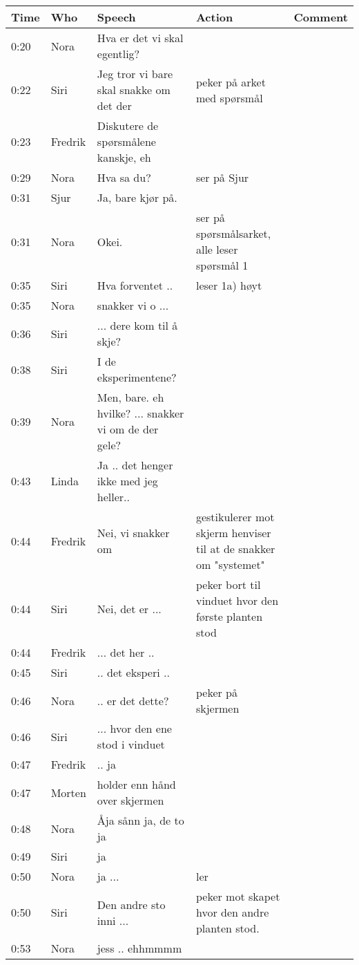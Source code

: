 
\def\arraystretch{1.8}
\begin{longtable}{@{}l l p{100pt} p{80pt} p{80pt}@{}}\toprule
    
    Time            & Who & Speech & Action & Comment \\ \midrule        

    0:20 &	Nora	& Hva er det vi skal egentlig?		\\
0:22	&	Siri	& Jeg tror vi bare skal snakke om det der &	peker på arket med spørsmål	\\
0:23 &	Fredrik	& Diskutere de spørsmålene kanskje, eh		\\
0:29 &	Nora	& Hva sa du?	& ser på Sjur	\\
0:31 &	Sjur	& Ja, bare kjør på.		\\
0:31 &	Nora	& Okei. &	ser på spørsmålsarket, alle leser spørsmål 1	\\
0:35 &	Siri	& Hva forventet .. &	leser 1a) høyt	\\
0:35 &	Nora	& snakker vi o ...		\\
0:36 &	Siri	& ... dere kom til å skje?		\\
0:38 &	Siri	& I de eksperimentene?		\\
0:39 &	Nora	& Men, bare. eh hvilke? ... snakker vi om de der gele?	\\	
0:43 &	Linda	& Ja .. det henger ikke med jeg heller..		\\
0:44 &	Fredrik	& Nei, vi snakker om &	gestikulerer mot skjerm	henviser til at de snakker om "systemet" \\
0:44 &	Siri	& Nei, det er ... &	peker bort til vinduet hvor den første planten stod	\\
0:44 &	Fredrik	& ... det her ..		\\
0:45 &	Siri	& .. det eksperi ..		\\
0:46 &	Nora	& .. er det dette? & 	peker på skjermen	\\
0:46 &	Siri	& ... hvor den ene stod i vinduet	\\	
0:47 &	Fredrik	& .. ja		\\
0:47 &	Morten	& 	holder enn hånd over skjermen	\\
0:48 &	Nora	& Åja sånn ja, de to ja		\\
0:49 &	Siri	& ja		\\
0:50 &	Nora	& ja ... &	ler	\\
0:50 &	Siri	& Den andre sto inni ... &	peker mot skapet hvor den andre planten stod.	\\
0:53 &	Nora	& jess .. ehhmmmm	                   \\                                                                       
   
    \bottomrule
\end{longtable}

	